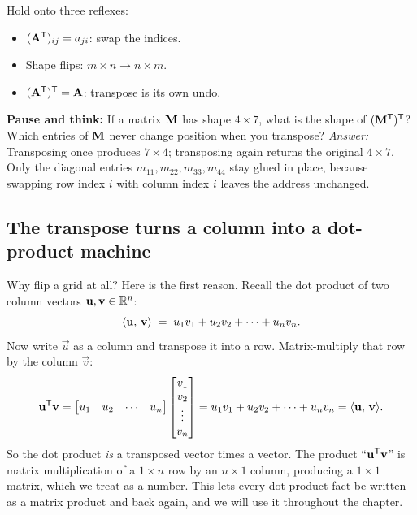 \begin{focusbox}
Hold onto three reflexes:
\begin{itemize}
  \item $(\mathbf{A}^{\mathsf{T}})_{ij} = a_{ji}$: swap the indices.
  \item Shape flips: $m\times n \to n\times m$.
  \item $(\mathbf{A}^{\mathsf{T}})^{\mathsf{T}} = \mathbf{A}$: transpose is its own undo.
\end{itemize}
\end{focusbox}

\begin{recoverybox}
\textbf{Pause and think:} If a matrix $\mathbf{M}$ has shape $4\times 7$, what is the shape of $(\mathbf{M}^{\mathsf{T}})^{\mathsf{T}}$?
Which entries of $\mathbf{M}$ never change position when you transpose?
\emph{Answer:} Transposing once produces $7\times 4$; transposing again returns the original $4\times 7$.
Only the diagonal entries $m_{11}, m_{22}, m_{33}, m_{44}$ stay glued in place, because swapping row index $i$
with column index $i$ leaves the address unchanged.
\end{recoverybox}

\subsection{The transpose turns a column into a dot-product machine}

Why flip a grid at all? Here is the first reason. Recall the dot product
of two column vectors $\mathbf{u},\mathbf{v}\in\mathbb{R}^n$:
\[
  \langle \mathbf{u},\, \mathbf{v} \rangle \;=\; u_1 v_1 + u_2 v_2 + \cdots + u_n v_n.
\]
Now write $\vec{u}$ as a column and transpose it into a row. Matrix-multiply that row by the column
$\vec{v}$:
\[
  \mathbf{u}^{\mathsf{T}} \mathbf{v}
  = \begin{bmatrix} u_1 & u_2 & \cdots & u_n \end{bmatrix}
    \begin{bmatrix} v_1 \\ v_2 \\ \vdots \\ v_n \end{bmatrix}
  = u_1v_1 + u_2v_2 + \cdots + u_nv_n
  = \langle \mathbf{u},\, \mathbf{v} \rangle.
\]
So the dot product \emph{is} a transposed vector times a vector. The product ``$\mathbf{u}^{\mathsf{T}}\mathbf{v}$''
is matrix multiplication of a $1\times n$ row by an $n\times 1$ column, producing a $1\times 1$
matrix, which we treat as a number. This lets every dot-product fact be
written as a matrix product and back again, and we will use it throughout the chapter.

